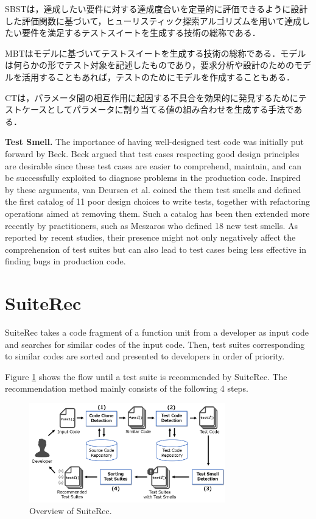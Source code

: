 \documentclass[conference]{IEEEtran}
\begin{document}
SBSTは，達成したい要件に対する達成度合いを定量的に評価できるように設計した評価関数に基づいて，ヒューリスティック探索アルゴリズムを用いて達成したい要件を満足するテストスイートを生成する技術の総称である．

MBTはモデルに基づいてテストスイートを生成する技術の総称である．モデルは何らかの形でテスト対象を記述したものであり，要求分析や設計のためのモデルを活用することもあれば，テストのためにモデルを作成することもある．

CTは，パラメータ間の相互作用に起因する不具合を効果的に発見するためにテストケースとしてパラメータに割り当てる値の組み合わせを生成する手法である．

\textbf{Test Smell.} The importance of having well-designed test code was initially put forward by Beck\cite{b4}. Beck argued that test cases respecting good design principles are desirable since these test cases are easier to comprehend, maintain, and can be successfully exploited to diagnose problems in the production code. Inspired by these arguments, van Deursen et al.\cite{b7} coined the them test smells and defined the first catalog of 11 poor design choices to write tests, together with refactoring operations aimed at removing them. Such a catalog has been then extended more recently by practitioners, such as Meszaros\cite{b6} who defined 18 new test smells. As reported by recent studies, their presence might not only negatively affect the comprehension of test suites but can also lead to test cases being less effective in finding bugs in production code\cite{b8}.

\section{SuiteRec}
SuiteRec takes a code fragment of a function unit from a developer as input code and searches for similar codes of the input code. Then, test suites corresponding to similar codes are sorted and presented to developers in order of priority.

Figure \ref{fig1} shows the flow until a test suite is recommended by SuiteRec. The recommendation method mainly consists of the following 4 steps.


\begin{figure}[htbp]
\centerline{\includegraphics[width=8.5cm]{SuiteRec-outline.pdf}}
\caption{Overview of SuiteRec.}
\label{fig1}
\end{figure}
\end{document}
